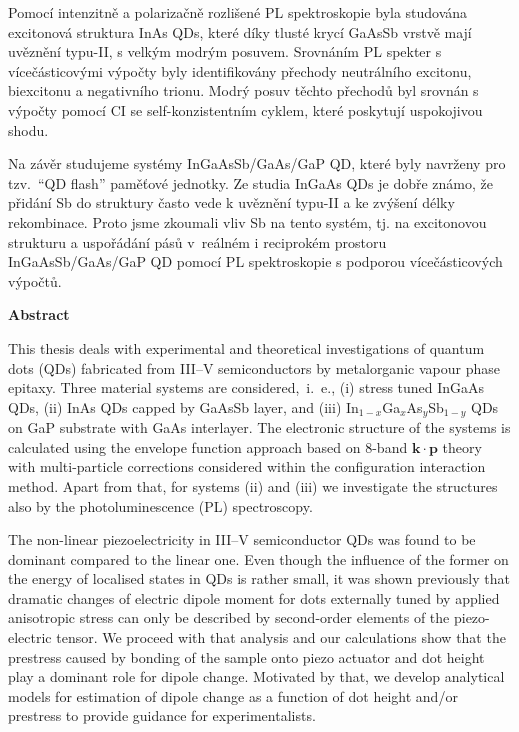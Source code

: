 \documentclass[
a4paper, %
11pt, %
onecolumn, %
openany, %
oldfontcommands,
]{memoir}
\begin{document}
Pomocí intenzitně a polarizačně rozlišené PL spektroskopie byla studována excitonová struktura InAs QDs, které díky tlusté krycí GaAsSb vrstvě mají uvěznění typu-II, s velkým modrým posuvem. Srovnáním PL spekter s vícečásticovými výpočty byly identifikovány přechody neutrálního excitonu, biexcitonu a negativního trionu. Modrý posuv těchto přechodů byl srovnán s výpočty pomocí CI se self-konzistentním cyklem, které poskytují uspokojivou shodu.


Na závěr studujeme systémy InGaAsSb/GaAs/GaP QD, které byly navrženy pro tzv.~\enquote{QD flash} paměťové jednotky. Ze studia InGaAs QDs je dobře známo, že přidání Sb do struktury často vede k uvěznění typu-II a ke zvýšení délky rekombinace. Proto jsme zkoumali vliv Sb na tento systém, tj. na excitonovou strukturu a uspořádání pásů v~reálném i reciprokém prostoru InGaAsSb/GaAs/GaP QD pomocí PL spektroskopie s podporou vícečásticových výpočtů.




\vspace{3cm}
\vfill

\cleardoublepage
\noindent\Large\textbf{Abstract}\\ \normalsize

\noindent This thesis deals with experimental and theoretical investigations of quantum dots (QDs) fabricated from III--V semiconductors by metalorganic vapour phase epitaxy. Three material systems are considered,~i.~e., (i) stress tuned InGaAs QDs, (ii) InAs QDs capped by GaAsSb layer, and (iii) In$_{1-x}$Ga$_x$As$_y$Sb$_{1-y}$ QDs on GaP substrate with GaAs interlayer. 
The electronic structure of the systems is calculated using the envelope function approach based on 8-band $\mathbf{k\cdot p}$ theory with multi-particle corrections considered within the configuration interaction method. Apart from that, for systems (ii) and (iii) we investigate the structures also by the photoluminescence (PL) spectroscopy.

The non-linear piezoelectricity in III--V semiconductor QDs was found to be dominant compared to the linear one. Even though the influence of the former on the energy of localised states in QDs is rather small, it was shown previously that dramatic changes of electric dipole moment for dots externally tuned by applied anisotropic stress can only be described by second-order elements of the piezo-electric tensor. 
%
%
We proceed with that analysis and our calculations show that the prestress caused by bonding of the sample onto piezo actuator and dot height play a dominant role for dipole change. Motivated by that, we develop analytical models for estimation of dipole change as a function of dot height and/or prestress to provide guidance for experimentalists.
\end{document}
